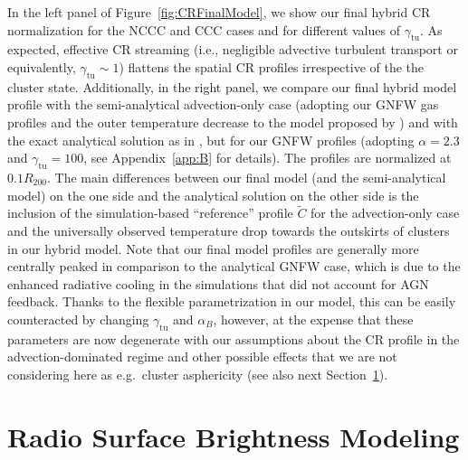 \documentclass[traditabstract]{aa}
\newcommand{\rmn}{\mathrm}
\begin{document}
In the left panel of Figure~\ref{fig:CRFinalModel}, we show our final hybrid CR 
normalization for the NCCC and CCC cases and for different values of $\gamma_{\rmn{tu}}$. 
As expected, effective CR streaming (i.e., negligible advective turbulent transport
or equivalently, $\gamma_{\rmn{tu}}\sim1$) flattens the spatial CR profiles
irrespective of the the cluster state. Additionally, in the right panel, we
compare our final hybrid model profile with the
semi-analytical advection-only case (adopting our GNFW gas profiles and the
outer temperature decrease to the model proposed by \citealp{2010MNRAS.409..449P})
and with the exact analytical solution as in \citet{2011A&A...527A..99E}, but
for our GNFW profiles (adopting $\alpha=2.3$ and $\gamma_{\rmn{tu}}=100$, see
Appendix~\ref{app:B} for details).  The profiles are normalized at $0.1 R_{200}$. 
The main differences between our final model (and the semi-analytical
model) on the one side and the analytical solution on the other side is the
inclusion of the simulation-based ``reference'' profile $\tilde{C}$ for the
advection-only case and the universally observed temperature drop towards the
outskirts of clusters in our hybrid model. Note that our final model profiles
are generally more centrally peaked in comparison to the analytical GNFW case,
which is due to the enhanced radiative cooling in the \citet{2010MNRAS.409..449P} 
simulations that did not account for AGN feedback. Thanks to the
flexible parametrization in our model, this can be easily counteracted by
changing $\gamma_{\rmn{tu}}$ and $\alpha_B$, however, at the expense that these
parameters are now degenerate with our assumptions about the CR profile in the
advection-dominated regime and other possible effects that we are not considering 
here as e.g.~cluster asphericity (see also next Section~\ref{sec:3}).


\section{Radio Surface Brightness Modeling}
\label{sec:3}
\end{document}
